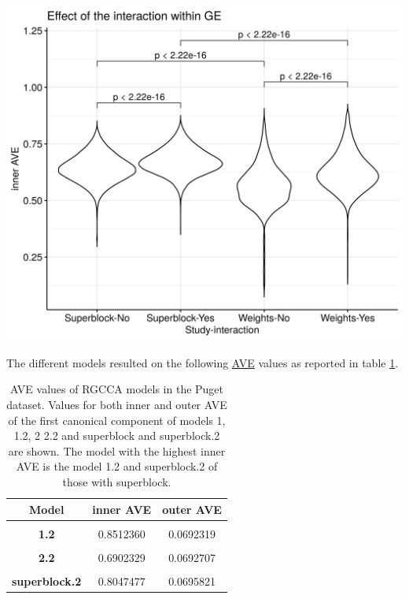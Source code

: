 \documentclass[
  12pt,
  a4paper,
  twoside,
  openright]{book}
\let\origfigure\figure
\let\endorigfigure\endfigure
\renewenvironment{figure}[1][2] {
    \expandafter\origfigure\expandafter[!htbp]
} {
    \endorigfigure
}
\begin{document}
\begin{figure}
\includegraphics[width=1\linewidth]{images/pugets-weights} \caption[Effects of superblock and weights on the inner AVE on Puget's dataset.]{Effects of superblock and weights on the inner AVE on Puget's dataset. Designs with the superblock showed higher inner AVE scores than without it. Interaction yes/no indicates RNA and RNA interaction. Higher inner AVE values are associated with relationships within the GE (p-values shown on top of the violin plots).}\label{fig:puget-weights}
\end{figure}

The different models resulted on the following \protect\hyperlink{acronyms_AVE}{AVE} values as reported in table \ref{tab:puget-models-ave}.

\begin{table}[H]

\caption[AVE values of RGCCA models in the Puget dataset.]{\label{tab:puget-models-ave}AVE values of RGCCA models in the Puget dataset. Values for both inner and outer AVE of the first canonical component of models 1, 1.2, 2 2.2 and superblock and superblock.2 are shown. The model with the highest inner AVE is the model 1.2 and  superblock.2 of those with superblock.}
\centering
\begin{tabular}[t]{>{}c|c|c}
\hline
\textbf{Model} & \textbf{inner AVE} & \textbf{outer AVE}\\
\hline
\textbf{\cellcolor{gray!6}{1}} & \cellcolor{gray!6}{0.6333592} & \cellcolor{gray!6}{0.0692097}\\
\hline
\textbf{1.2} & 0.8512360 & 0.0692319\\
\hline
\textbf{\cellcolor{gray!6}{2}} & \cellcolor{gray!6}{0.2791546} & \cellcolor{gray!6}{0.0738695}\\
\hline
\textbf{2.2} & 0.6902329 & 0.0692707\\
\hline
\textbf{\cellcolor{gray!6}{superblock}} & \cellcolor{gray!6}{0.7055847} & \cellcolor{gray!6}{0.0734578}\\
\hline
\textbf{superblock.2} & 0.8047477 & 0.0695821\\
\hline
\end{tabular}
\end{table}
\end{document}
